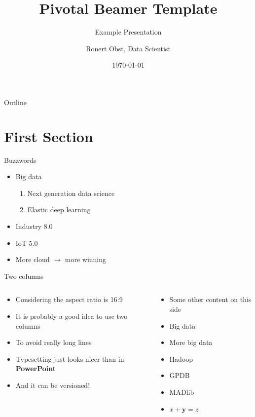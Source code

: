 \documentclass[english,presentation]{pivotalbeamer}
\subtitle{Example Presentation}
\author{Ronert Obst, Data Scientist}
\date{\today}
\title{Pivotal Beamer Template}
\begin{document}
\maketitle
\begin{frame}{Outline}
\tableofcontents
\end{frame}

\section{First Section}
\label{sec-1}
\begin{frame}[fragile,label=sec-1-1]{Buzzwords}
\begin{itemize}
\item Big data
\begin{enumerate}
\item Next generation data science
\item Elastic deep learning
\end{enumerate}
\item Industry 8.0
\item IoT 5.0
\item More cloud $\rightarrow$ more winning
\end{itemize}
\end{frame}

\begin{frame}[fragile,label=sec-1-2]{Two columns}
\begin{columns}
\begin{column}{0.5\textwidth}
\begin{itemize}
\item Considering the aspect ratio is 16:9
\item It is probably a good idea to use two columns
\item To avoid really long lines
\item Typesetting just looks nicer than in \textbf{PowerPoint}
\item And it can be versioned!
\end{itemize}
\end{column}

\begin{column}{0.5\textwidth}
\begin{itemize}
\item Some other content on this side
\item Big data
\item More big data
\item Hadoop
\item GPDB
\item MADlib
\item $x+\mathbf{y} = z$
\end{itemize}
\end{column}
\end{columns}
\end{frame}
\end{document}
